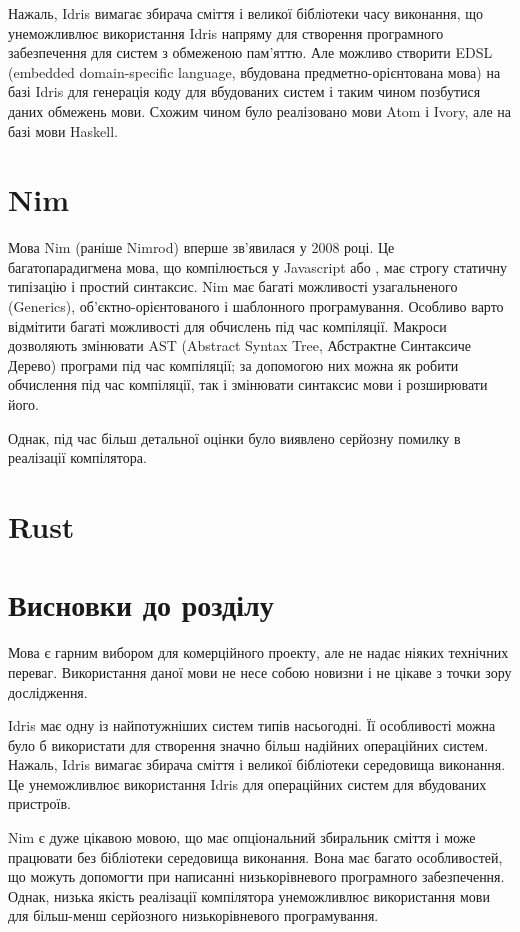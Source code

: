 \documentclass[oneside,14pt,a4paper,final]{myextreport}
\newcommand{\specialsection}[1]{\section*{#1}\addcontentsline{toc}{section}{#1}}
\newcommand{\chapterconslusions}{
  \specialsection{Висновки до розділу \thechapter}
}
\begin{document}
Нажаль, Idris вимагає збирача сміття і великої бібліотеки часу виконання, що унеможливлює використання Idris напряму для створення програмного забезпечення для систем з обмеженою пам'яттю. Але можливо створити EDSL (embedded domain-specific language, вбудована предметно-орієнтована мова) на базі Idris для генерація коду для вбудованих систем і таким чином позбутися даних обмежень мови. Схожим чином було реалізовано мови Atom\cite{haskell:atom} і Ivory\cite{haskell:ivory}, але на базі мови Haskell\cite{haskell}.

\section{Nim}

Мова Nim\cite{nim} (раніше Nimrod) вперше зв'явилася у 2008 році. Це багатопарадигмена мова, що компілюється у Javascript або \LangC{}, має строгу статичну типізацію і простий синтаксис. Nim має багаті можливості узагальненого 
(Generics), об'єктно-орієнтованого і шаблонного програмування. Особливо варто відмітити багаті можливості для обчислень під час компіляції. Макроси дозволяють змінювати AST (Abstract Syntax Tree, Абстрактне Синтаксиче Дерево) програми під час компіляції; за допомогою них можна як робити обчислення під час компіляції, так і змінювати синтаксис мови і розширювати його.

Однак, під час більш детальної оцінки було виявлено серйозну помилку в реалізації компілятора.

\section{Rust}

\chapterconslusions{}

Мова \LangC{} є гарним вибором для комерційного проекту, але не надає ніяких технічних переваг. Використання даної мови не несе собою новизни і не цікаве з точки зору дослідження.

Idris має одну із найпотужніших систем типів насьогодні. Її особливості можна було б використати для створення значно більш надійних операційних систем. Нажаль, Idris вимагає збирача сміття і великої бібліотеки середовища виконання. Це унеможливлює використання Idris для операційних систем для вбудованих пристроїв.

Nim є дуже цікавою мовою, що має опціональний збиральник сміття і може працювати без бібліотеки середовища виконання. Вона має багато особливостей, що можуть допомогти при написанні низькорівневого програмного забезпечення. Однак, низька якість реалізації компілятора унеможливлює використання мови для більш-менш серйозного низькорівневого програмування.
\end{document}
